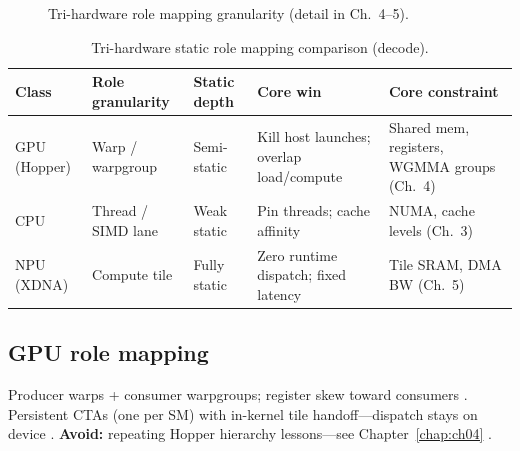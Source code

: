\begin{figure}[t]
\centering
{}
\caption{Tri-hardware role mapping granularity (detail in Ch.~4--5).}
\label{fig:ch07_tri_hw_roles}
\end{figure}

\begin{table}[t]
\centering
\small
\caption{Tri-hardware static role mapping comparison (decode).}
\label{tab:ch07_tri_hw_roles}
\begin{tabular}{@{}p{2.0cm}p{2.2cm}p{1.6cm}p{2.4cm}p{2.6cm}@{}}
\toprule
\textbf{Class} & \textbf{Role granularity} & \textbf{Static depth} & \textbf{Core win} & \textbf{Core constraint} \\
\midrule
GPU (Hopper) & Warp / warpgroup & Semi-static & Kill host launches; overlap load/compute & Shared mem, registers, WGMMA groups (Ch.~4) \\
CPU & Thread / SIMD lane & Weak static & Pin threads; cache affinity & NUMA, cache levels (Ch.~3) \\
NPU (XDNA) & Compute tile & Fully static & Zero runtime dispatch; fixed latency & Tile SRAM, DMA BW (Ch.~5) \\
\bottomrule
\end{tabular}
\end{table}

\subsection{GPU role mapping}
\label{sec:ch07_thread_mapping}

Producer warps + consumer warpgroups; register skew toward consumers \citep{shah2024flashattention3,nvidia2022hopper}.
Persistent CTAs (one per SM) with in-kernel tile handoff---dispatch stays on device \citep{shah2024flashattention3,mpk2025}.
\textbf{Avoid:} repeating Hopper hierarchy lessons---see Chapter~\ref{chap:ch04} \citep{nvidia2022hopper,semianalysis2024tma}.

